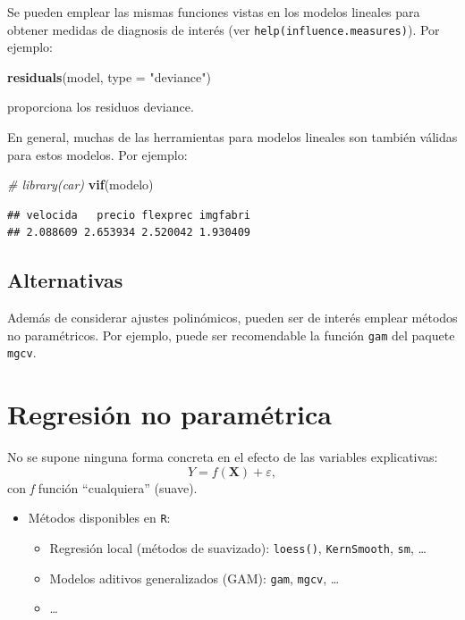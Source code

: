 \documentclass[]{book}
\newenvironment{Shaded}{\begin{snugshade}}{\end{snugshade}}
\newcommand{\KeywordTok}[1]{\textcolor[rgb]{0.13,0.29,0.53}{\textbf{#1}}}
\newcommand{\DataTypeTok}[1]{\textcolor[rgb]{0.13,0.29,0.53}{#1}}
\newcommand{\StringTok}[1]{\textcolor[rgb]{0.31,0.60,0.02}{#1}}
\newcommand{\CommentTok}[1]{\textcolor[rgb]{0.56,0.35,0.01}{\textit{#1}}}
\newcommand{\NormalTok}[1]{#1}
\begin{document}
Se pueden emplear las mismas funciones vistas en los modelos lineales
para obtener medidas de diagnosis de interés (ver
\texttt{help(influence.measures)}). Por ejemplo:

\begin{Shaded}
\begin{Highlighting}[]
\KeywordTok{residuals}\NormalTok{(model, }\DataTypeTok{type =} \StringTok{"deviance"}\NormalTok{) }
\end{Highlighting}
\end{Shaded}

proporciona los residuos deviance.

En general, muchas de las herramientas para modelos lineales son también
válidas para estos modelos. Por ejemplo:

\begin{Shaded}
\begin{Highlighting}[]
\CommentTok{# library(car)}
\KeywordTok{vif}\NormalTok{(modelo)}
\end{Highlighting}
\end{Shaded}

\begin{verbatim}
## velocida   precio flexprec imgfabri 
## 2.088609 2.653934 2.520042 1.930409
\end{verbatim}

\section{Alternativas}\label{alternativas-1}

Además de considerar ajustes polinómicos, pueden ser de interés emplear
métodos no paramétricos. Por ejemplo, puede ser recomendable la función
\texttt{gam} del paquete \texttt{mgcv}.

\chapter{Regresión no paramétrica}\label{regresion-no-parametrica}

No se supone ninguna forma concreta en el efecto de las variables
explicativas: \[Y=f\left(  \mathbf{X}\right)  +\varepsilon,\] con
\emph{f} función ``cualquiera'' (suave).

\begin{itemize}
\item
  Métodos disponibles en \texttt{R}:

  \begin{itemize}
  \item
    Regresión local (métodos de suavizado): \texttt{loess()},
    \texttt{KernSmooth}, \texttt{sm}, \ldots{}
  \item
    Modelos aditivos generalizados (GAM): \texttt{gam}, \texttt{mgcv},
    \ldots{}
  \item
    \ldots{}
  \end{itemize}
\end{itemize}
\end{document}
